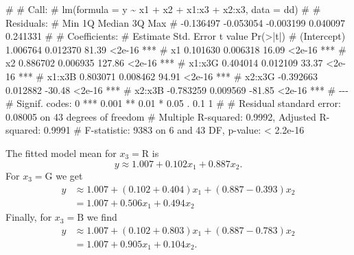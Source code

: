 \documentclass[
  a4paper,
]{article}
\newenvironment{Shaded}{\begin{snugshade}}{\end{snugshade}}
\newcommand{\NormalTok}[1]{#1}
\theoremstyle{definition}
\theoremstyle{definition}
\theoremstyle{definition}
\theoremstyle{definition}
\theoremstyle{remark}
\begin{document}
\begin{myanswers}
\begin{Shaded}
\begin{Highlighting}[]
\NormalTok{\# }
\NormalTok{\# Call:}
\NormalTok{\# lm(formula = y \textasciitilde{} x1 + x2 + x1:x3 + x2:x3, data = dd)}
\NormalTok{\# }
\NormalTok{\# Residuals:}
\NormalTok{\#       Min        1Q    Median        3Q       Max }
\NormalTok{\# {-}0.136497 {-}0.053054 {-}0.003199  0.040097  0.241331 }
\NormalTok{\# }
\NormalTok{\# Coefficients:}
\NormalTok{\#              Estimate Std. Error t value Pr(\textgreater{}|t|)    }
\NormalTok{\# (Intercept)  1.006764   0.012370   81.39   \textless{}2e{-}16 ***}
\NormalTok{\# x1           0.101630   0.006318   16.09   \textless{}2e{-}16 ***}
\NormalTok{\# x2           0.886702   0.006935  127.86   \textless{}2e{-}16 ***}
\NormalTok{\# x1:x3G       0.404014   0.012109   33.37   \textless{}2e{-}16 ***}
\NormalTok{\# x1:x3B       0.803071   0.008462   94.91   \textless{}2e{-}16 ***}
\NormalTok{\# x2:x3G      {-}0.392663   0.012882  {-}30.48   \textless{}2e{-}16 ***}
\NormalTok{\# x2:x3B      {-}0.783259   0.009569  {-}81.85   \textless{}2e{-}16 ***}
\NormalTok{\# {-}{-}{-}}
\NormalTok{\# Signif. codes:  0 \textquotesingle{}***\textquotesingle{} 0.001 \textquotesingle{}**\textquotesingle{} 0.01 \textquotesingle{}*\textquotesingle{} 0.05 \textquotesingle{}.\textquotesingle{} 0.1 \textquotesingle{} \textquotesingle{} 1}
\NormalTok{\# }
\NormalTok{\# Residual standard error: 0.08005 on 43 degrees of freedom}
\NormalTok{\# Multiple R{-}squared:  0.9992,  Adjusted R{-}squared:  0.9991 }
\NormalTok{\# F{-}statistic:  9383 on 6 and 43 DF,  p{-}value: \textless{} 2.2e{-}16}
\end{Highlighting}
\end{Shaded}

The fitted model mean for \(x_3 = \mathrm{R}\) is
\begin{equation*}
  y
  \approx 1.007 + 0.102 x_1 + 0.887 x_2.
\end{equation*}
For \(x_3 = \mathrm{G}\) we get
\begin{align*}
  y
  &\approx 1.007 + (0.102 + 0.404) x_1 + (0.887 - 0.393) x_2 \\
  &= 1.007 + 0.506 x_1 + 0.494 x_2
\end{align*}
Finally, for \(x_3 = \mathrm{B}\) we find
\begin{align*}
  y
  &\approx 1.007 + (0.102 + 0.803) x_1 + (0.887 - 0.783) x_2 \\
  &= 1.007 + 0.905 x_1 + 0.104 x_2.
\end{align*}

\end{myanswers}
\end{document}
